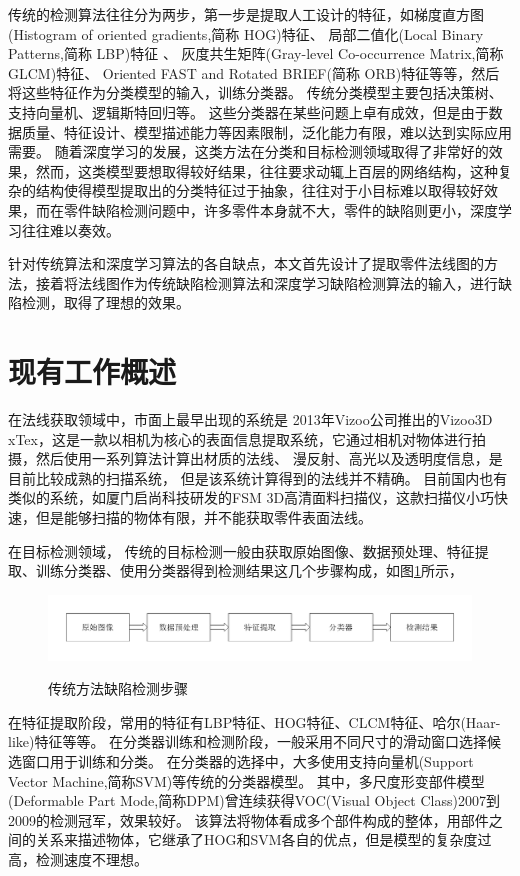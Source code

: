 传统的检测算法往往分为两步，第一步是提取人工设计的特征，如梯度直方图\cite{dalal2005histograms}(Histogram of oriented gradients,简称 HOG)特征、
局部二值化\cite{ojala2000gray}(Local Binary Patterns,简称 LBP)特征
、
灰度共生矩阵\cite{haralick1973textural}(Gray-level Co-occurrence Matrix,简称GLCM)特征、
Oriented FAST and Rotated BRIEF\cite{rublee2011orb}(简称 ORB)特征等等，然后将这些特征作为分类模型的输入，训练分类器。
传统分类模型主要包括决策树、支持向量机、逻辑斯特回归等。
这些分类器在某些问题上卓有成效，但是由于数据质量、特征设计、模型描述能力等因素限制，泛化能力有限，难以达到实际应用需要。
随着深度学习的发展，这类方法在分类和目标检测领域取得了非常好的效果，然而，这类模型要想取得较好结果，往往要求动辄上百层的网络结构，这种复杂的结构使得模型提取出的分类特征过于抽象，往往对于小目标难以取得较好效果，而在零件缺陷检测问题中，许多零件本身就不大，零件的缺陷则更小，深度学习往往难以奏效。

针对传统算法和深度学习算法的各自缺点，本文首先设计了提取零件法线图的方法，接着将法线图作为传统缺陷检测算法和深度学习缺陷检测算法的输入，进行缺陷检测，取得了理想的效果。

\section{现有工作概述}

在法线获取领域中，市面上最早出现的系统是
2013年Vizoo公司推出的Vizoo3D xTex，这是一款以相机为核心的表面信息提取系统，它通过相机对物体进行拍摄，然后使用一系列算法计算出材质的法线、
漫反射、高光以及透明度信息，是目前比较成熟的扫描系统，
但是该系统计算得到的法线并不精确。
目前国内也有
类似的系统，如厦门启尚科技研发的FSM 3D高清面料扫描仪，这款扫描仪小巧快
速，但是能够扫描的物体有限，并不能获取零件表面法线。

在目标检测领域，
传统的目标检测一般由获取原始图像、数据预处理、特征提取、训练分类器、使用分类器得到检测结果这几个步骤构成，如图\ref{chuantongjiancebuzhou}所示，
\begin{figure}[htbp]
\centering
\includegraphics[width=1.0\linewidth]{figures/chuantongjiancebuzhou.PNG}\\
\caption{传统方法缺陷检测步骤}\label{chuantongjiancebuzhou}
\end{figure}
在特征提取阶段，常用的特征有LBP特征、HOG特征、CLCM特征、哈尔\cite{viola2001rapid}(Haar-like)特征等等。
在分类器训练和检测阶段，一般采用不同尺寸的滑动窗口选择候选窗口用于训练和分类。
在分类器的选择中，大多使用支持向量机\cite{hearst1998support}(Support Vector Machine,简称SVM)等传统的分类器模型。
其中，多尺度形变部件模型\cite{felzenszwalb2010object}(Deformable Part Mode,简称DPM)曾连续获得VOC(Visual Object Class)2007到2009的检测冠军，效果较好。
该算法将物体看成多个部件构成的整体，用部件之间的关系来描述物体，它继承了HOG和SVM各自的优点，但是模型的复杂度过高，检测速度不理想。

